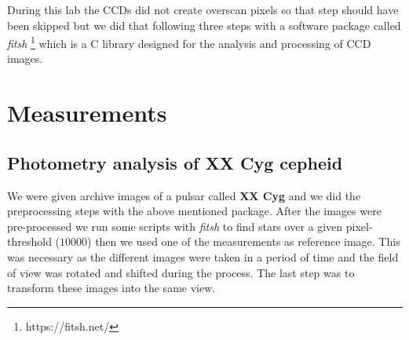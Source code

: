 \documentclass[a4paper,12pt]{article}
\begin{document}
\par During this lab the CCDs did not create overscan pixels so that step should have been skipped but we did that
following three steps with a software package called \textit{fitsh} \footnote{https://fitsh.net/} which is a C library
designed for the analysis and processing of CCD images.

\section{Measurements}

\subsection{Photometry analysis of XX Cyg cepheid}

\par We were given archive images of a pulsar called \textbf{XX Cyg} and we did the preprocessing steps with the above mentioned package.
After the images were pre-processed we run some scripts with \textit{fitsh} to find stars over a given pixel-threshold ($10000$) then we
used one of the measurements as reference image. This was necessary as the different images were taken in a period of time and
the field of view was rotated and shifted during the process. The last step was to transform these images into the same view.

\vspace{0.5cm}
\end{document}
